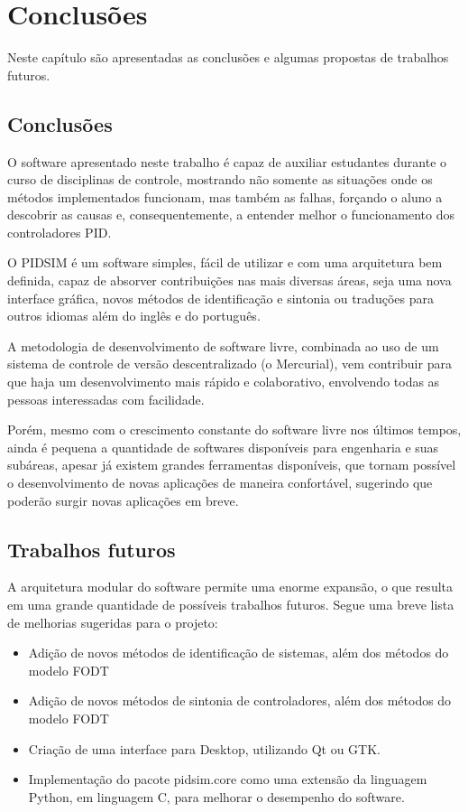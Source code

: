\chapter{Conclusões \label{cap:conclusoes}}

Neste capítulo são apresentadas as conclusões e algumas propostas de
trabalhos futuros.

\section{Conclusões}

    O software apresentado neste trabalho é capaz de auxiliar estudantes
    durante o curso de disciplinas de controle, mostrando não somente
    as situações onde os métodos implementados funcionam, mas também as
    falhas, forçando o aluno a descobrir as causas e, consequentemente, a
    entender melhor o funcionamento dos controladores \acs{PID}.

    O PIDSIM é um software simples, fácil de utilizar e com uma arquitetura
    bem definida, capaz de absorver contribuições nas mais diversas áreas,
    seja uma nova interface gráfica, novos métodos de identificação
    e sintonia ou traduções para outros idiomas além do inglês e do português.
    
    A metodologia de desenvolvimento de software livre, combinada ao uso
    de um sistema de controle de versão descentralizado (o Mercurial), vem
    contribuir para que haja um desenvolvimento mais rápido e colaborativo,
    envolvendo todas as pessoas interessadas com facilidade.
    
    Porém, mesmo com o crescimento constante do software livre nos últimos tempos,
    ainda é pequena a quantidade de softwares disponíveis para engenharia
    e suas subáreas, apesar já existem grandes ferramentas disponíveis,
    que tornam possível o desenvolvimento de novas aplicações de maneira
    confortável, sugerindo que poderão surgir novas aplicações em breve.
    

\section{Trabalhos futuros}

    A arquitetura modular do software permite uma enorme expansão, o que
    resulta em uma grande quantidade de possíveis trabalhos futuros.
    Segue uma breve lista de melhorias sugeridas para o projeto:
    
    \begin{itemize}
        \item Adição de novos métodos de identificação de sistemas, além dos
            métodos do modelo \acs{FODT}
        \item Adição de novos métodos de sintonia de controladores, além dos
            métodos do modelo \acs{FODT}
        \item Criação de uma interface para Desktop, utilizando Qt ou GTK.
        \item Implementação do pacote pidsim.core como uma extensão da linguagem Python,
	    em linguagem C, para melhorar o desempenho do software.
    \end{itemize}
